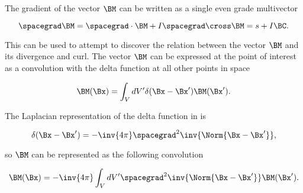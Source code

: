 %
%
The gradient of the vector \( \BM \) can be written as a single even grade multivector

\begin{equation}\label{eqn:helmholtzDerviationMultivector:60}
\spacegrad \BM
= \spacegrad \cdot \BM + I \spacegrad \cross \BM
= s + I \BC.
\end{equation}

%
%
%

This can be used to attempt to discover the relation between the vector \( \BM \) and its divergence and curl.  
The vector \( \BM \) can be expressed at the point of interest as a convolution with the delta function at all other points in space

\begin{dmath}\label{eqn:helmholtzDerviationMultivector:80}
\BM(\Bx) = \int_V dV' \delta(\Bx - \Bx') \BM(\Bx').
\end{dmath}

The Laplacian representation of the delta function in  is

\begin{dmath}\label{eqn:helmholtzDerviationMultivector:100}
\delta(\Bx - \Bx') = -\inv{4\pi} \spacegrad^2 \inv{\Norm{\Bx - \Bx'}},
\end{dmath}

so \( \BM \) can be represented as the following convolution

\begin{dmath}\label{eqn:helmholtzDerviationMultivector:120}
\BM(\Bx) = -\inv{4\pi} \int_V dV' \spacegrad^2 \inv{\Norm{\Bx - \Bx'}} \BM(\Bx').
\end{dmath}

%
%

